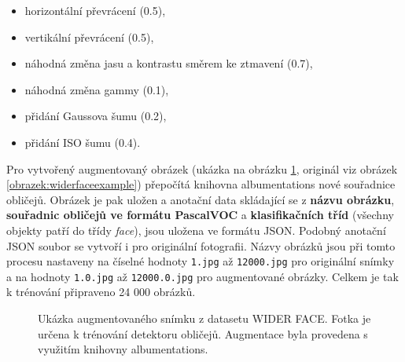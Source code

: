\begin{itemize}
  \item horizontální převrácení (0.5),
  \item vertikální převrácení (0.5),
  \item náhodná změna jasu a kontrastu směrem ke ztmavení (0.7),
  \item náhodná změna gammy (0.1),
  \item přidání Gaussova šumu (0.2),
  \item přidání ISO šumu (0.4).
\end{itemize}

Pro vytvořený augmentovaný obrázek (ukázka na obrázku \ref{obrazek:augmentovanyobrazek}, originál viz obrázek \ref{obrazek:widerfaceexample}) přepočítá knihovna albumentations nové souřadnice obličejů. Obrázek je pak uložen a anotační data skládající se z \textbf{názvu obrázku}, \textbf{souřadnic obličejů ve formátu PascalVOC} a \textbf{klasifikačních tříd} (všechny objekty patří do třídy \emph{face}), jsou uložena ve formátu JSON. Podobný anotační JSON soubor se vytvoří i pro originální fotografii. Názvy obrázků jsou při tomto procesu nastaveny na číselné hodnoty \texttt{1.jpg} až \texttt{12000.jpg} pro originální snímky a na hodnoty \texttt{1.0.jpg} až \texttt{12000.0.jpg} pro augmentované obrázky. Celkem je tak k trénování připraveno 24 000 obrázků.

\begin{figure}[H]
  \begin{center}
  \label{obrazek:augmentovanyobrazek}
  \caption{Ukázka augmentovaného snímku z datasetu WIDER FACE. Fotka je určena k trénování detektoru obličejů. Augmentace byla provedena s využitím knihovny albumentations.}
  \end{center}
\end{figure}

